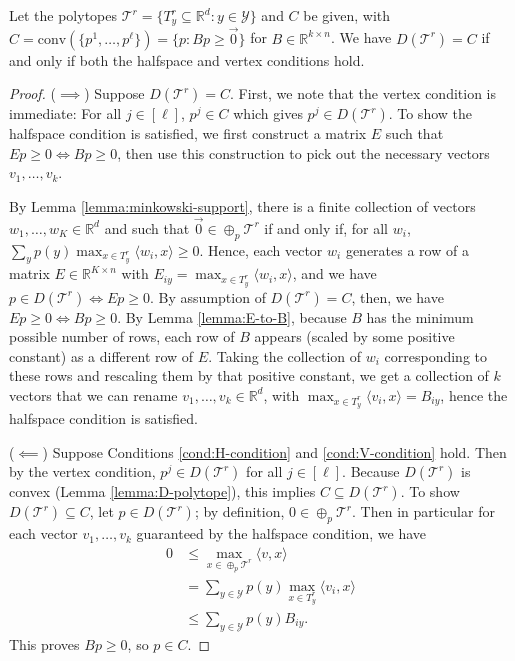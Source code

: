 \documentclass[anon]{colt2020} %
\newcommand{\reals}{\mathbb{R}}
\newcommand{\T}{\mathcal{T}}
\newcommand{\Y}{\mathcal{Y}}
\newcommand{\inprod}[2]{\langle #1, #2 \rangle}%
\newcommand{\conv}{\mathrm{conv}}
\begin{document}
\begin{theorem} \label{thm:vertex-halfspace-opt}
  Let the polytopes $\T^r = \{T^r_y \subseteq \reals^d : y \in \Y\}$ and $C$ be given, with $C = \conv(\{p^1,\ldots,p^{\ell}\}) = \{p: Bp \geq \vec 0\}$ for $B \in \reals^{k \times n}$.
  We have $D(\T^r) = C$ if and only if both the halfspace and vertex conditions hold.
\end{theorem}
\begin{proof}
  ($\implies$)
  Suppose $D(\T^r) = C$.
  First, we note that the vertex condition is immediate: For all $j \in [\ell]$, $p^j \in C$ which gives $p^j \in D(\T^r)$.
  To show the halfspace condition is satisfied, we first construct a matrix $E$ such that $Ep \geq 0 \iff Bp \geq 0$, then use this construction to pick out the necessary vectors $v_1,\dots,v_k$.

  By Lemma \ref{lemma:minkowski-support}, there is a finite collection of vectors $w_1,\dots,w_{K} \in \reals^d$ and such that $\vec 0 \in \oplus_p \T^r$ if and only if, for all $w_i$, $\sum_y p(y) \max_{x \in T^r_y} \inprod{w_i}{x} \geq 0$.
  Hence, each vector $w_i$ generates a row of a matrix $E \in \reals^{K \times n}$ with $E_{iy} = \max_{x \in T^r_y} \inprod{w_i}{x}$, and we have $p \in D(\T^r) \iff Ep \geq 0$.
  By assumption of $D(\T^r) = C$, then, we have $Ep \geq 0 \iff Bp \geq 0$.
  By Lemma \ref{lemma:E-to-B}, because $B$ has the minimum possible number of rows, each row of $B$ appears (scaled by some positive constant) as a different row of $E$. Taking the collection of $w_i$ corresponding to these rows and rescaling them by that positive constant, we get a collection of $k$ vectors that we can rename $v_1,\ldots,v_k \in \reals^d$, with $\max_{x \in T^r_y} \inprod{v_i}{x} = B_{iy}$, hence the halfspace condition is satisfied.

  ($\impliedby$)
  Suppose Conditions \ref{cond:H-condition} and \ref{cond:V-condition} hold.
  Then by the vertex condition, $p^j \in D(\T^r)$ for all $j \in [\ell]$.
  Because $D(\T^r)$ is convex (Lemma \ref{lemma:D-polytope}), this implies $C \subseteq D(\T^r)$.
  To show $D(\T^r) \subseteq C$, let $p \in D(\T^r)$; by definition, $0 \in \oplus_p \T^r$.
  Then in particular for each vector $v_1,\ldots,v_k$ guaranteed by the halfspace condition, we have
  \begin{align*}
    0 &\leq \max_{x \in \oplus_p \T^r} \inprod{v}{x}  \\
      &=    \sum_{y \in \Y} p(y) \max_{x \in T^r_y} \inprod{v_i}{x}  \\
      &\leq \sum_{y \in \Y} p(y) B_{iy} .
  \end{align*}
  This proves $Bp \geq 0$, so $p \in C$.
\end{proof}
\end{document}
